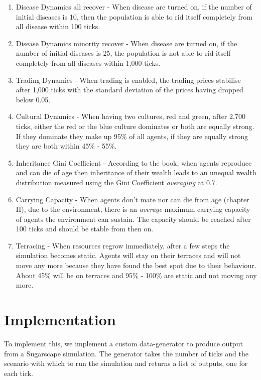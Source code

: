 \begin{enumerate}
	\item Disease Dynamics all recover - When disease are turned on, if the number of initial diseases is 10, then the population is  able to rid itself completely from all disease within 100 ticks. 
	
	\item Disease Dynamics minority recover - When disease are turned on, if the number of initial diseases is 25, the population is not able to rid itself completely from all diseases within 1,000 ticks.
	
	\item Trading Dynamics - When trading is enabled, the trading prices stabilise after 1,000 ticks with the standard deviation of the prices having dropped below 0.05.
	
	\item Cultural Dynamics - When having two cultures, red and green, after 2,700 ticks, either the red or the blue culture dominates or both are equally strong. If they dominate they make up 95\% of all agents, if they are equally strong they are both within 45\% - 55\%.
	
	\item Inheritance Gini Coefficient - According to the book, when agents reproduce and can die of age then inheritance of their wealth leads to an unequal wealth distribution measured using the Gini Coefficient \textit{averaging} at 0.7.
	
	\item Carrying Capacity - When agents don't mate nor can die from age (chapter II), due to the environment, there is an \textit{average} maximum carrying capacity of agents the environment can sustain. The capacity should be reached after 100 ticks and should be stable from then on.
		
	\item Terracing - When resources regrow immediately, after a few steps the simulation becomes static. Agents will stay on their terraces and will not move any more because they have found the best spot due to their behaviour. About 45\% will be on terraces and 95\% - 100\% are static and not moving any more.
\end{enumerate}

\section{Implementation}
To implement this, we implement a custom data-generator to produce output from a Sugarscape simulation. The generator takes the number of ticks and the scenario with which to run the simulation and returns a list of outputs, one for each tick.

